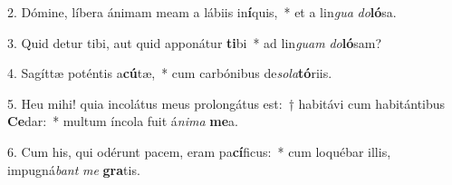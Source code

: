 \item 2. Dómine, líbera ánimam meam a lábiis in\textbf{í}quis,~* et a lin\textit{gua} \textit{do}\textbf{ló}sa.
\item 3. Quid detur tibi, aut quid apponátur \textbf{ti}bi~* ad lin\textit{guam} \textit{do}\textbf{ló}sam?
\item 4. Sagíttæ poténtis a\textbf{cú}tæ,~* cum carbónibus de\hspace{0.03em}\textit{sola}\textbf{tó}riis.
\item 5. Heu mihi! quia incolátus meus prolongátus est:~† habitávi cum habitántibus \textbf{Ce}dar:~* multum íncola fuit á\textit{nima} \textbf{me}a.
\item 6. Cum his, qui odérunt pacem, eram pa\textbf{cí}ficus:~* cum loquébar illis, impugná\textit{bant} \textit{me} \textbf{gra}tis.
